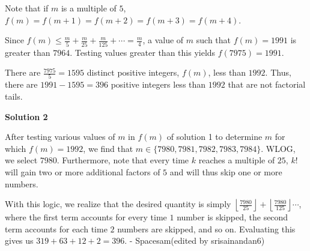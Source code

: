 \begin{enumerate}
 Note that if $m$ is a multiple of $5$, $f(m) = f(m+1) = f(m+2) = f(m+3) = f(m+4)$. 

 Since $f(m) \le \frac{m}{5} + \frac{m}{25} + \frac{m}{125} + \cdots  = \frac{m}{4}$, a value of $m$ such that $f(m) = 1991$ is greater than $7964$. Testing values greater than this yields $f(7975)=1991$.

 There are $\frac{7975}{5} = 1595$ distinct positive integers, $f(m)$, less than $1992$. Thus, there are $1991-1595 = \boxed{396}$ positive integers less than $1992$ that are not factorial tails.

 



\textbf{Solution 2}

After testing various values of $m$ in $f(m)$ of solution 1 to determine $m$ for which $f(m) = 1992$, we find that $m \in \{7980, 7981, 7982, 7983, 7984\}$. WLOG, we select $7980$. Furthermore, note that every time $k$ reaches a multiple of $25$, $k!$ will gain two or more additional factors of $5$ and will thus skip one or more numbers.

 With this logic, we realize that the desired quantity is simply $\left \lfloor \frac{7980}{25} \right \rfloor + \left \lfloor \frac{7980}{125} \right \rfloor \cdots$, where the first term accounts for every time $1$ number is skipped, the second term accounts for each time $2$ numbers are skipped, and so on. Evaluating this gives us $319 + 63 + 12 + 2 = \boxed{396}$. - Spacesam(edited by srisainandan6)

 


\end{enumerate}